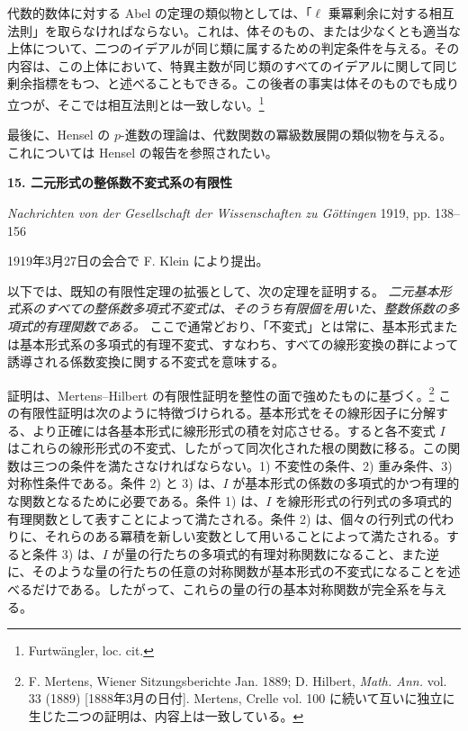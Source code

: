 \documentclass[11pt]{article}
\begin{document}
代数的数体に対する Abel の定理の類似物としては、「\(\ell\) 乗冪剰余に対する相互法則」を取らなければならない。これは、体そのもの、または少なくとも適当な上体について、二つのイデアルが同じ類に属するための判定条件を与える。その内容は、この上体において、特異主数が同じ類のすべてのイデアルに関して同じ剰余指標をもつ、と述べることもできる。この後者の事実は体そのものでも成り立つが、そこでは相互法則とは一致しない。\footnote{Furtwängler, loc. cit.}

最後に、Hensel の \(p\)-進数の理論は、代数関数の冪級数展開の類似物を与える。これについては Hensel の報告を参照されたい。


\providecommand{\frH}{\mathfrak H}
\providecommand{\frK}{\mathfrak K}
\providecommand{\frM}{\mathfrak M}
\providecommand{\frN}{\mathfrak N}
\providecommand{\frG}{\mathfrak G}
\providecommand{\frS}{\mathfrak S}
\providecommand{\tmod}[1]{\;(\operatorname{mod} #1)}

\clearpage
\begin{center}
{\Large\bfseries 15. 二元形式の整係数不変式系の有限性}\par
\vspace{1em}
\emph{Nachrichten von der Gesellschaft der Wissenschaften zu Göttingen} 1919, pp. 138--156
\end{center}

\vspace{2em}
\begin{center}
1919年3月27日の会合で F. Klein により提出。
\end{center}

以下では、既知の有限性定理の拡張として、次の定理を証明する。
\emph{二元基本形式系のすべての整係数多項式不変式は、そのうち有限個を用いた、整数係数の多項式的有理関数である。}
ここで通常どおり、「不変式」とは常に、基本形式または基本形式系の多項式的有理不変式、すなわち、すべての線形変換の群によって誘導される係数変換に関する不変式を意味する。

証明は、Mertens--Hilbert の有限性証明を整性の面で強めたものに基づく。\footnote{F. Mertens, Wiener Sitzungsberichte Jan. 1889; D. Hilbert, \emph{Math. Ann.} vol. 33 (1889) [1888年3月の日付]. Mertens, Crelle vol. 100 に続いて互いに独立に生じた二つの証明は、内容上は一致している。}
この有限性証明は次のように特徴づけられる。基本形式をその線形因子に分解する、より正確には各基本形式に線形形式の積を対応させる。すると各不変式 \(I\) はこれらの線形形式の不変式、したがって同次化された根の関数に移る。この関数は三つの条件を満たさなければならない。1) 不変性の条件、2) 重み条件、3) 対称性条件である。条件 2) と 3) は、\(I\) が基本形式の係数の多項式的かつ有理的な関数となるために必要である。条件 1) は、\(I\) を線形形式の行列式の多項式的有理関数として表すことによって満たされる。条件 2) は、個々の行列式の代わりに、それらのある冪積を新しい変数として用いることによって満たされる。すると条件 3) は、\(I\) が量の行たちの多項式的有理対称関数になること、また逆に、そのような量の行たちの任意の対称関数が基本形式の不変式になることを述べるだけである。したがって、これらの量の行の基本対称関数が完全系を与える。
\end{document}
